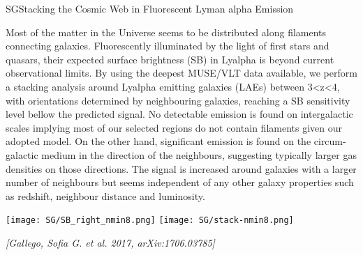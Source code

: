 \begin{section}{SG}{Stacking the Cosmic Web in Fluorescent Lyman alpha Emission}
  \begin{minipage}[l]{\textwidth}

    {\small Most of the matter in the Universe seems to be distributed along
      filaments connecting galaxies. Fluorescently illuminated by the light of
      first stars and quasars, their expected surface brightness (SB) in
      Lyalpha is beyond current observational limits. By using the deepest
      MUSE/VLT data available, we perform a stacking analysis around Lyalpha
      emitting galaxies (LAEs) between 3<z<4, with orientations determined by
      neighbouring galaxies, reaching a SB sensitivity level bellow the
      predicted signal. No detectable emission is found on intergalactic
      scales implying most of our selected regions do not contain filaments
      given our adopted model. On the other hand, significant emission is
      found on the circum-galactic medium in the direction of the neighbours,
      suggesting typically larger gas densities on those directions. The
      signal is increased around galaxies with a larger number of neighbours
      but seems independent of any other galaxy properties such as redshift,
      neighbour distance and luminosity.}
  \end{minipage}

  \vspace{0.5cm}

  \begin{minipage}{\linewidth}
    \begin{center}
      \texttt{[image: SG/SB\_right\_nmin8.png]}
      \texttt{[image: SG/stack-nmin8.png]}
    \end{center}
  \end{minipage}

  \vspace{0.5cm}

  {\footnotesize \textit{[Gallego, Sofia G. et al. 2017, arXiv:1706.03785]}}
\end{section}